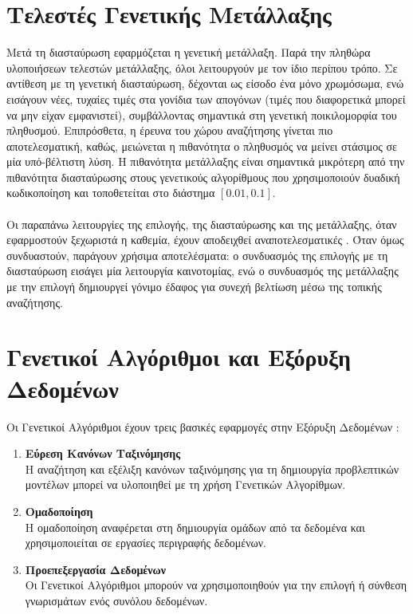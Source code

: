 \section{Τελεστές Γενετικής Μετάλλαξης}
Μετά τη διασταύρωση εφαρμόζεται η γενετική μετάλλαξη. Παρά την πληθώρα υλοποιήσεων τελεστών μετάλλαξης, όλοι λειτουργούν με τον ίδιο περίπου τρόπο. Σε αντίθεση με τη γενετική διασταύρωση, δέχονται ως είσοδο ένα μόνο χρωμόσωμα, ενώ εισάγουν νέες, τυχαίες τιμές στα γονίδια των απογόνων (τιμές που διαφορετικά μπορεί να μην είχαν εμφανιστεί), συμβάλλοντας σημαντικά στη γενετική ποικιλομορφία του πληθυσμού. Επιπρόσθετα, η έρευνα του χώρου αναζήτησης γίνεται πιο αποτελεσματική, καθώς, μειώνεται η πιθανότητα ο πληθυσμός να μείνει στάσιμος σε μία υπό-βέλτιστη λύση. Η πιθανότητα μετάλλαξης είναι σημαντικά μικρότερη από την πιθανότητα διασταύρωσης στους γενετικούς αλγορίθμους που χρησιμοποιούν δυαδική κωδικοποίηση και τοποθετείται στο διάστημα $[0.01, 0.1]$. 
\\
\\
Οι παραπάνω λειτουργίες της επιλογής, της διασταύρωσης και της μετάλλαξης, όταν εφαρμοστούν ξεχωριστά η καθεμία, έχουν αποδειχθεί αναποτελεσματικές \citep{goldberg02}. Όταν όμως συνδυαστούν, παράγουν χρήσιμα αποτελέσματα: ο συνδυασμός της επιλογής με τη διασταύρωση εισάγει μία λειτουργία καινοτομίας, ενώ ο συνδυασμός της μετάλλαξης με την επιλογή δημιουργεί γόνιμο έδαφος για συνεχή βελτίωση μέσω της τοπικής αναζήτησης.

\section{Γενετικοί Αλγόριθμοι και Εξόρυξη Δεδομένων}
Οι Γενετικοί Αλγόριθμοι έχουν τρεις βασικές εφαρμογές στην Εξόρυξη Δεδομένων \cite{freitas}:

\begin{enumerate}
\item\textbf{Εύρεση Κανόνων Ταξινόμησης}
\\
Η αναζήτηση και εξέλιξη κανόνων ταξινόμησης για τη δημιουργία προβλεπτικών μοντέλων μπορεί να υλοποιηθεί με τη χρήση Γενετικών Αλγορίθμων.
\item\textbf{Ομαδοποίηση}
\\
Η ομαδοποίηση αναφέρεται στη δημιουργία ομάδων από τα δεδομένα και χρησιμοποιείται σε εργασίες περιγραφής δεδομένων.
\item\textbf{Προεπεξεργασία Δεδομένων}
\\
Οι Γενετικοί Αλγόριθμοι μπορούν να χρησιμοποιηθούν για την επιλογή ή σύνθεση γνωρισμάτων ενός συνόλου δεδομένων.
\end{enumerate}

